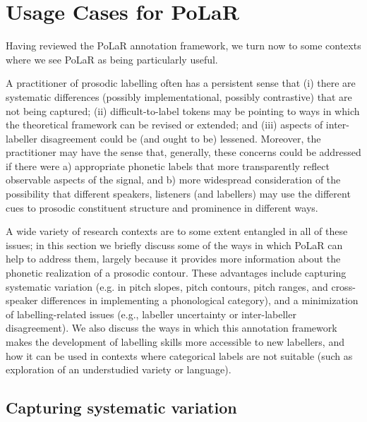 \documentclass[11pt, twoside]{memoir}
\begin{document}
\chapter{Usage Cases for PoLaR}\label{ch:advantages}

Having reviewed the PoLaR annotation framework, we turn now to some contexts where we see PoLaR as being particularly useful.

A practitioner of prosodic labelling often has a persistent sense that (i) there are systematic differences (possibly implementational, possibly contrastive) that are not being captured; (ii) difficult-to-label tokens may be pointing to ways in which the theoretical framework can be revised or extended; and (iii) aspects of inter-labeller disagreement could be (and ought to be) lessened. Moreover, the practitioner may have the sense that, generally, these concerns could be addressed if there were a) appropriate phonetic labels that more transparently reflect observable aspects of the signal, and b) more widespread consideration of the possibility that different speakers, listeners (and labellers) may use the different cues to prosodic constituent structure and prominence in different ways.

A wide variety of research contexts are to some extent entangled in all of these issues; in this section we briefly discuss some of the ways in which PoLaR can help to address them, largely because it provides more information about the phonetic realization of a prosodic contour. These advantages include capturing systematic variation (e.g. in pitch slopes, pitch contours, pitch ranges, and cross-speaker differences in implementing a phonological category), and a minimization of labelling-related issues (e.g., labeller uncertainty or inter-labeller disagreement). We also discuss the ways in which this annotation framework makes the development of labelling skills more accessible to new labellers, and how it can be used in contexts where categorical labels are not suitable (such as exploration of an understudied variety or language). 


\section{Capturing systematic variation}\label{sec:capturing-systematic-variation}
\end{document}
